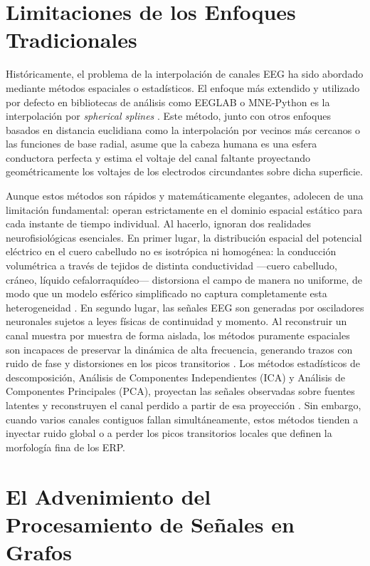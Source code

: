 \section{Limitaciones de los Enfoques Tradicionales}

Históricamente, el problema de la interpolación de canales EEG ha sido abordado mediante métodos espaciales o estadísticos. El enfoque más extendido y utilizado por defecto en bibliotecas de análisis como EEGLAB \cite{delorme2004eeglab} o MNE-Python \cite{gramfort2013meg,gramfort2014mne} es la interpolación por \textit{spherical splines} \cite{perrin1989}. Este método, junto con otros enfoques basados en distancia euclidiana como la interpolación por vecinos más cercanos o las funciones de base radial, asume que la cabeza humana es una esfera conductora perfecta y estima el voltaje del canal faltante proyectando geométricamente los voltajes de los electrodos circundantes sobre dicha superficie.

Aunque estos métodos son rápidos y matemáticamente elegantes, adolecen de una limitación fundamental: operan estrictamente en el dominio espacial estático para cada instante de tiempo individual. Al hacerlo, ignoran dos realidades neurofisiológicas esenciales. En primer lugar, la distribución espacial del potencial eléctrico en el cuero cabelludo no es isotrópica ni homogénea: la conducción volumétrica a través de tejidos de distinta conductividad ---cuero cabelludo, cráneo, líquido cefalorraquídeo--- distorsiona el campo de manera no uniforme, de modo que un modelo esférico simplificado no captura completamente esta heterogeneidad \cite{nunez2006electric}. En segundo lugar, las señales EEG son generadas por osciladores neuronales sujetos a leyes físicas de continuidad y momento. Al reconstruir un canal muestra por muestra de forma aislada, los métodos puramente espaciales son incapaces de preservar la dinámica de alta frecuencia, generando trazos con ruido de fase y distorsiones en los picos transitorios \cite{lai2005controlled}.
Los métodos estadísticos de descomposición, Análisis de Componentes Independientes (ICA) y Análisis de Componentes Principales (PCA), proyectan las señales observadas sobre fuentes latentes y reconstruyen el canal perdido a partir de esa proyección \cite{jung2001imaging}. Sin embargo, cuando varios canales contiguos fallan simultáneamente, estos métodos tienden a inyectar ruido global o a perder los picos transitorios locales que definen la morfología fina de los ERP.

\section{El Advenimiento del Procesamiento de Señales en Grafos}

